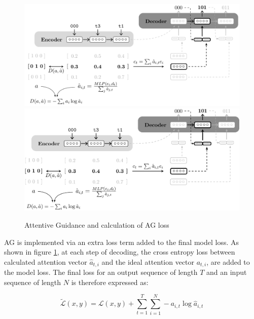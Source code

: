 \begin{figure}
	\begin{minipage}[t]{\textwidth}
		\ifpdf
		\includegraphics[width=\linewidth,keepaspectratio=true]{./figs/ag-model-pdf}
		\else
		\includegraphics[width=\linewidth,keepaspectratio=true]{./figs/ag-model-eps}
		\fi
		\caption{\small Attentive Guidance and calculation of AG loss \citep{Hupkes2018}}
		\label{pm:ag-loss}
	\end{minipage}
\end{figure}

AG is implemented via an extra loss term added to the final model loss. As shown in figure \ref{pm:ag-loss}, at each step of decoding, the cross entropy loss between calculated attention vector $\hat{a}_{t,i}$ and the ideal attention vector $a_{t,i}$, are added to the model loss. The final loss for an output sequence of length $T$ and an input sequence of length $N$ is therefore expressed as:

\begin{equation}
\widetilde{\mathcal{L}}(x,y) = \mathcal{L}(x,y) + \sum_{t=1}^T \sum_{i=1}^N -a_{i,t}\log\hat{a}_{i,t}
\end{equation}

